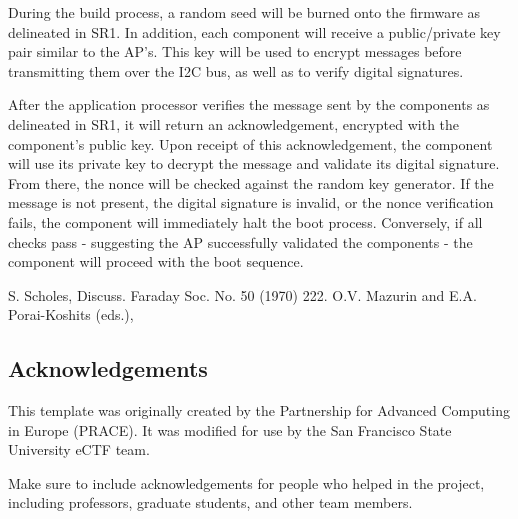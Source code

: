 \documentclass{prace}
\begin{document}
During the build process, a random seed will be burned onto the firmware as delineated in 
SR1. In addition, each component will receive a public/private key pair similar to the AP's.
This key will be used to encrypt messages before transmitting them over the I2C bus, as well
as to verify digital signatures.

After the application processor verifies the message sent by the components as delineated
in SR1, it will return an acknowledgement, encrypted with the component's public key. Upon
receipt of this acknowledgement, the component will use its private key to decrypt the 
message and validate its digital signature. From there, the nonce will be checked against
the random key generator. If the message is not present, the digital signature is invalid,
or the nonce verification fails, the component will immediately halt the boot process.
Conversely, if all checks pass - suggesting the AP successfully validated the components -
the component will proceed with the boot sequence.

%
\begin{thebibliography}{99}
	S. Scholes, Discuss. Faraday Soc. No. 50 (1970) 222.
	O.V. Mazurin and E.A. Porai-Koshits (eds.),
\end{thebibliography}

\subsection*{Acknowledgements}
This template was originally created by the Partnership for Advanced Computing
in Europe (PRACE). It was modified for use by the San Francisco State University
eCTF team.

Make sure to include acknowledgements for people who helped in the project,
including professors, graduate students, and other team members.

\end{document}
